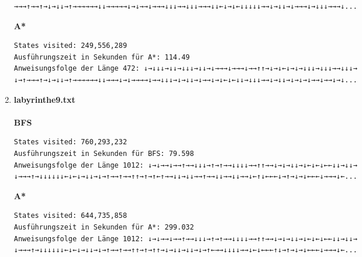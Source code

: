 \documentclass[a4paper,10pt,ngerman]{scrartcl}
\begin{document}
\begin{enumerate}
\begin{verbatim}
→→→↑→→↑→↓→↓↓→↑→→→→→→↓↓→→→→→↓→↓→→↓→→→↓↓↓→→↓↓↓→→→↓↓←↓→↓←↓↓↓↓↓→→↓→↓↓→↓→→→↓→↓↓↓→→→↓...
\end{verbatim}
\textbf{A*}
\begin{verbatim}
States visited: 249,556,289
Ausführungszeit in Sekunden für A*: 114.49
Anweisungsfolge der Länge 472: ↓→↓↓↓→↓↓→↓↓↓→↓↓→↓→→→↓→→→↓→→↑↑→↓→↓←↓→↓→↓↓↓→↓↓↓→→↓↓↓→
↓→↑→→→↑→↓→↓↓→↑→→→→→→↓↓→→→↓→↓→→→→↓→→↓↓↓→↓→↓↓→↓→→↓→↓←↓←↓↓→↓↓↓→→↓→↓↓→↓→↓→↓→→↓→→↓→↓...
\end{verbatim}
  \item \textbf{labyrinthe9.txt}\\
\\\textbf{BFS}
\begin{verbatim}
States visited: 760,293,232
Ausführungszeit in Sekunden für BFS: 79.598
Anweisungsfolge der Länge 1012: ↓→↓→→↓→→↑→→↓↓↓→↑→↑→→↓↓↓↓→→↑↑→→↓→↓→↓↓→↓←↓←↓←←↓↓→↓↓→
↓→→→↑→↓↓↓↓↓↓←↓←↓→↓↓→↓→↑→→↑→→↑↑→↑→↑←↑→→↓↓→↓↓→→↑→→↓↓→→↓↓→→↓←↑↓←←←↓→↑→↓→↓←←←↓→→→↓←...
\end{verbatim}
\textbf{A*}
\begin{verbatim}
States visited: 644,735,858
Ausführungszeit in Sekunden für A*: 299.032
Anweisungsfolge der Länge 1012: ↓→↓→→↓→→↑→→↓↓↓→↑→↑→→↓↓↓↓→→↑↑→→↓→↓→↓↓→↓←↓←↓←←↓↓→↓↓→
↓→→→↑→↓↓↓↓↓↓←↓←↓→↓↓→↓→↑→→↑→→↑↑→↑→↑↑→↓→↓↓→↓↓→↓→↑←→→↓↓↓↓→→↓←↓←←←↑↓→↑→↓→↓←←←↓→→→↓←...
\end{verbatim}
\end{enumerate}
\end{document}
